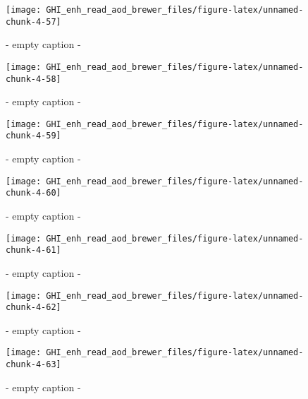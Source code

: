 \documentclass[
  10pt,
  a4paper,oneside]{article}
\begin{document}
\begin{figure}[H]

{\centering \texttt{[image: GHI\_enh\_read\_aod\_brewer\_files/figure-latex/unnamed-chunk-4-57]} 

}

\caption{ - empty caption - }\label{fig:unnamed-chunk-4-57}
\end{figure}
\begin{figure}[H]

{\centering \texttt{[image: GHI\_enh\_read\_aod\_brewer\_files/figure-latex/unnamed-chunk-4-58]} 

}

\caption{ - empty caption - }\label{fig:unnamed-chunk-4-58}
\end{figure}
\begin{figure}[H]

{\centering \texttt{[image: GHI\_enh\_read\_aod\_brewer\_files/figure-latex/unnamed-chunk-4-59]} 

}

\caption{ - empty caption - }\label{fig:unnamed-chunk-4-59}
\end{figure}
\begin{figure}[H]

{\centering \texttt{[image: GHI\_enh\_read\_aod\_brewer\_files/figure-latex/unnamed-chunk-4-60]} 

}

\caption{ - empty caption - }\label{fig:unnamed-chunk-4-60}
\end{figure}
\begin{figure}[H]

{\centering \texttt{[image: GHI\_enh\_read\_aod\_brewer\_files/figure-latex/unnamed-chunk-4-61]} 

}

\caption{ - empty caption - }\label{fig:unnamed-chunk-4-61}
\end{figure}
\begin{figure}[H]

{\centering \texttt{[image: GHI\_enh\_read\_aod\_brewer\_files/figure-latex/unnamed-chunk-4-62]} 

}

\caption{ - empty caption - }\label{fig:unnamed-chunk-4-62}
\end{figure}
\begin{figure}[H]

{\centering \texttt{[image: GHI\_enh\_read\_aod\_brewer\_files/figure-latex/unnamed-chunk-4-63]} 

}

\caption{ - empty caption - }\label{fig:unnamed-chunk-4-63}
\end{figure}
\end{document}
